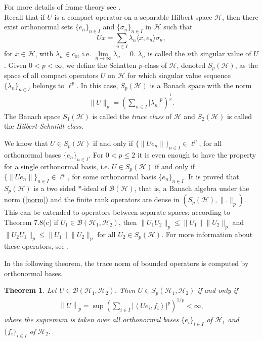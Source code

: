 \documentclass{birkjour}
\newtheorem{thm}{Theorem}[section]
\theoremstyle{definition}
\theoremstyle{remark}
\numberwithin{equation}{section}
\newcommand{\BL}[1]{
{\mathcal B} \left( #1 \right)
}
\begin{document}
For more details of frame theory see \cite{framepsycho16,Casaz1,Chr08}.\\

Recall that if $U$ is a compact operator on a separable Hilbert
space $\mathcal{H}$, then there exist orthonormal sets $\{e_{n}\}_{n\in I}$
and $\{\sigma_{n}\}_{n\in I}$ in $\mathcal{H}$ such that
$$Ux=\sum_{n\in I}\lambda_{n}\langle x, e_{n}\rangle\sigma_{n},  $$ for
$x\in \mathcal{H}$, with $\lambda_{n} \in c_0$, i.e. $\lim \limits_{n \rightarrow \infty} \lambda_{n} = 0$. $\lambda_{n}$ is called the $n$th singular
value of $U$. Given $0<p<\infty$, we define the Schatten $p$-class
of $\mathcal{H}$, denoted $S_{p}(\mathcal{H})$, as the space of all compact
operators $U$ on $\mathcal{H}$ for which singular value sequence
$\{\lambda_{n}\}_{n\in I}$ belongs to $\ell^{p}$. In this case, $S_{p}(\mathcal{H})$
is a Banach space with the norm
\begin{eqnarray}\label{norm}
\|U\|_{p}=\left(\sum_{n\in I}|\lambda_{n}|^{p}\right)^{\frac{1}{p}}.
\end{eqnarray}
The Banach space $S_{1}(\mathcal{H})$ is called the\textit{ trace class} of $\mathcal{H}$ and
$S_{2}(\mathcal{H})$ is called the \textit{Hilbert-Schmidt class.}

We know that $U\in S_p(\mathcal{H})$ if and only if
$\{\|{Ue_n}\|\}_{n\in I} {\in \ell^p}$, for all orthonormal bases
$\{e_n\}_{n\in I}$. For $0<p \leq 2$ it is even enough to have the
property for a single orthonormal basis, i.e. $U \in S_p
(\mathcal{H})$ if and only if $\{\|{Ue_n}\|\}_{n\in I}{\in
\ell^p}$, for some orthonormal basis $\{e_n\}_{n\in I}$. It is
proved that $S_p(\mathcal{H})$ is a two sided $*$-ideal of
$\BL{\mathcal{H}}$, that is, a Banach algebra under the norm
(\ref{norm}) and the finite rank operators are dense in
$(S_p(\mathcal{H}), \|.\|_p)$.
This can be extended to operators between separate spaces;
according to Theorem 7.8(c) \cite{weidm80} if $U_1\in
\BL{\mathcal{H}_1,\mathcal{H}_2}$, then $\|U_1 U_2\|_p
\leq\|U_1\|\|U_2\|_p$ and $\|U_2 U_1\|_p\leq\|U_1\|\|U_2\|_p$ for
all $U_2\in S_p(\mathcal{H})$. For more information about these
operators, see \cite{Pi,Schatten,weidm80,zhuo}.

In the following theorem, the trace norm of bounded operators is
computed by orthonormal bases.

\begin{thm}\label{ring}\cite{weidm80}
Let $U\in \BL{\mathcal{H}_{1},\mathcal{H}_{2}}$. Then  $U\in
S_p(\mathcal{H}_1,\mathcal{H}_2)$ if and only if
\begin{eqnarray*}
\left\|U\right\|_{p}=\sup \left( \sum \limits_{i\in I}\left|\left\langle Ue_{i},f_{i}\right\rangle\right|^p \right)^{1/p}  < \infty , 
\end{eqnarray*}
where the supremum is taken over all orthonormal bases $\{e_{i}\}_{i\in I}$ of $\mathcal{H}_{1}$ and $\{f_{i}\}_{i\in I}$ of $\mathcal{H}_{2}$.
\end{thm}
\end{document}
